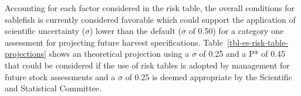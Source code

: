 \documentclass[
  english,
]{article}
\begin{document}
\endgroup

\newpage{}

Accounting for each factor considered in the risk table, the overall
conditions for sablefish is currently considered favorable which could
support the application of scientific uncertainty (\(\sigma\)) lower
than the default (\(\sigma\) of 0.50) for a category one assessment for
projecting future harvest specifications.
Table~\ref{tbl-es-risk-table-projections} shows an theoretical
projection using a \(\sigma\) of 0.25 and a P* of 0.45 that could be
considered if the use of risk tables is adopted by management for future
stock assessments and a \(\sigma\) of 0.25 is deemed appropriate by the
Scientific and Statistical Committee.

\begingroup
\fontsize{9.0pt}{11.0pt}\selectfont
\end{document}
